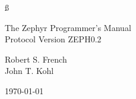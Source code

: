 %
\ss
\vspace*{1.5in}

\begin{center}
{\Huge The Zephyr Programmer's Manual} \\
\vspace{.5in}
{\Large Protocol Version ZEPH0.2}
\end{center}

\vspace*{.25in}

\begin{center}
{\Large Robert S. French \\
\vspace{1ex}
John T. Kohl}
\end{center}

\vspace*{.75in}

\begin{center}
\today

\end{center}



\ess
